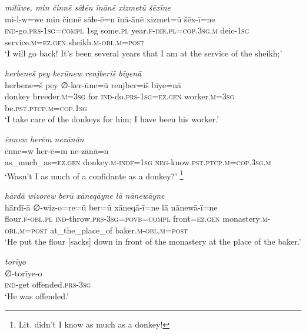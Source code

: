 \ea \label{HB.68}
\textit{milūwe, min činnē sāɫēn īnānē xizmetū šēxīne} \\ 
\gll mi-l-w=we min činnē sāɫe-ē=n īnā-ānē xizmet=ū šēx-ī=ne \\ 
 \textsc{ind-}go\textsc{.prs}\textsc{-1sg}\textsc{=\textsc{compl}} 1sg some\textsc{.pl} year\textsc{\textsc{.f}}\textsc{-dir}\textsc{.pl}\textsc{=cop}\textsc{.3sg}\textsc{.m} deic\textsc{-1sg} service\textsc{.m}\textsc{=ez}\textsc{.gen} sheikh\textsc{.m}\textsc{-obl}\textsc{.m}\textsc{=\textsc{post}} \\ 
\glt `I will go back! It’s been several years that I am at the service of the sheikh;'
\z 
 
\ea \label{HB.69}
\textit{herbeneš pey kerūnew renjberiš bīyenā} \\ 
\gll herbene=š pey ∅-ker-ūne=ū renjber=iš bīye=nā \\ 
 donkey breeder\textsc{.m}\textsc{=3sg} for \textsc{ind-}do\textsc{.prs}\textsc{-1sg}\textsc{=ez}\textsc{.gen} worker\textsc{.m}\textsc{=3sg} be\textsc{.pst}\textsc{.ptcp}\textsc{.m}\textsc{=cop}\textsc{.1sg} \\ 
\glt `I take care of the donkeys for him; I have been his worker.'
\z 
 
\ea \label{HB.70}
\textit{ēnnew herēm nezānān} \\ 
\gll ēnne=w her-ē=m ne-zānā=n \\ 
 as\_much\_as\textsc{=ez}\textsc{.gen} donkey\textsc{.m}\textsc{-indf}\textsc{=1sg} \textsc{neg-}know\textsc{.pst}\textsc{.ptcp}\textsc{.m}\textsc{=cop}\textsc{.3sg}\textsc{.m} \\ 
\glt `Wasn’t I as much of a confidante as a donkey?' \footnote{Lit. didn’t I know as much as a donkey!}
\z 
 
\ea \label{HB.73}
\textit{hārdā wizorew berū xāneqāyne lā nānewāyne} \\ 
\gll hārdī-ā ∅-wiz-o=re=ū ber=ū xāneqā-ī=ne lā nānewā-ī=ne \\ 
 flour\textsc{\textsc{.f}}\textsc{-obl}\textsc{.pl} \textsc{ind-}throw\textsc{.prs}\textsc{-3sg}\textsc{=\textsc{povb}}=\textsc{compl} front\textsc{=ez}\textsc{.gen} monastery\textsc{.m}\textsc{-obl}\textsc{.m}\textsc{=\textsc{post}} at\_the\_place\_of baker\textsc{.m}\textsc{-obl}\textsc{.m}\textsc{=\textsc{post}} \\ 
\glt `He put the flour [sacks] down in front of the monastery at the place of the baker.'
\z 
 
\ea \label{HB.74}
\textit{torīyo} \\ 
\gll ∅-torīye-o \\ 
 \textsc{ind-}get offended\textsc{.prs}\textsc{-3sg} \\ 
\glt `He was offended.'
\z 
 
